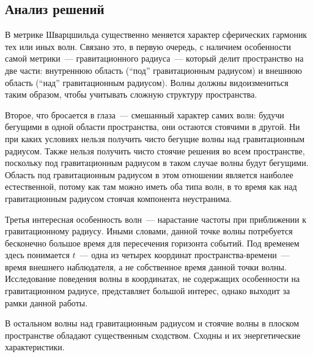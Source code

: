 \documentclass[\docroot/reports/draft/report.tex]{subfiles}
\begin{document}
\subsection{Анализ решений}

    В метрике Шварцшильда существенно меняется характер сферических гармоник тех или иных волн. Связано это, в первую очередь, с наличием особенности самой метрики~--- гравитационного радиуса~--- который делит пространство на две части: внутреннюю область (\enquote{под} гравитационным радиусом) и внешнюю область (\enquote{над} гравитационным радиусом). Волны должны видоизмениться таким образом, чтобы учитывать сложную структуру пространства.

    Второе, что бросается в глаза~--- смешанный характер самих волн: будучи бегущими в одной области пространства, они остаются стоячими в другой. Ни при каких условиях нельзя получить чисто бегущие волны над гравитационным радиусом. Также нельзя получить чисто стоячие решения во всем пространстве, поскольку под гравитационным радиусом в таком случае волны будут бегущими. Область под гравитационным радиусом в этом отношении является наиболее естественной, потому как там можно иметь оба типа волн, в то время как над гравитационным радиусом стоячая компонента неустранима.

    Третья интересная особенность волн~--- нарастание частоты при приближении к гравитационному радиусу. Иными словами, данной точке волны потребуется бесконечно большое время для пересечения горизонта событий. Под временем здесь понимается $t$~--- одна из четырех координат пространства-времени~--- время внешнего наблюдателя, а не собственное время данной точки волны. Исследование поведения волны в координатах, не содержащих особенности на гравитационном радиусе, представляет большой интерес, однако выходит за рамки данной работы.

    В остальном волны над гравитационным радиусом и стоячие волны в плоском пространстве обладают существенным сходством. Сходны и их энергетические характеристики.

\end{document}
